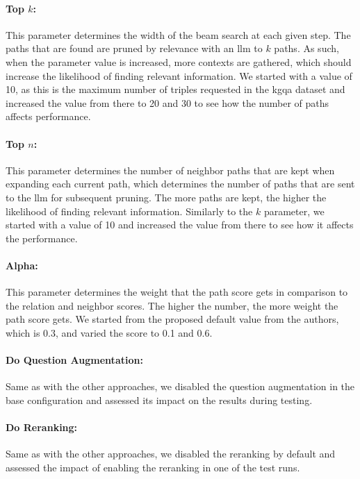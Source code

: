 \paragraph{Top $k$:} This parameter determines the width of the beam search at each given step. The paths that are found are pruned by relevance with an \gls{llm} to $k$ paths. As such, when the parameter value is increased, more contexts are gathered, which should increase the likelihood of finding relevant information. We started with a value of 10, as this is the maximum number of triples requested in the \gls{kgqa} dataset and increased the value from there to 20 and 30 to see how the number of paths affects performance.

\paragraph{Top $n$:} This parameter determines the number of neighbor paths that are kept when expanding each current path, which determines the number of paths that are sent to the \gls{llm} for subsequent pruning. The more paths are kept, the higher the likelihood of finding relevant information. Similarly to the $k$ parameter, we started with a value of 10 and increased the value from there to see how it affects the performance.

\paragraph{Alpha:} This parameter determines the weight that the path score gets in comparison to the relation and neighbor scores. The higher the number, the more weight the path score gets. We started from the proposed default value from the authors, which is 0.3, and varied the score to 0.1 and 0.6.

\paragraph{Do Question Augmentation:} Same as with the other approaches, we disabled the question augmentation in the base configuration and assessed its impact on the results during testing.

\paragraph{Do Reranking:} Same as with the other approaches, we disabled the reranking by default and assessed the impact of enabling the reranking in one of the test runs.

